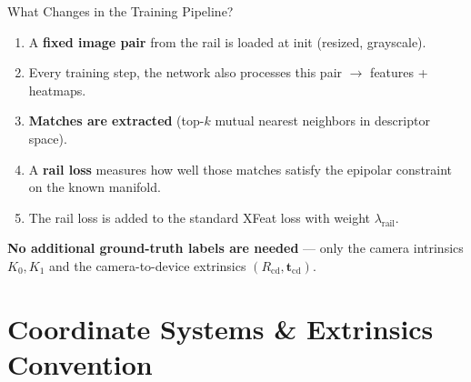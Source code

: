 \documentclass[aspectratio=169, 12pt]{beamer}
\newcommand{\Rcd}{R_{\mathrm{cd}}}
\newcommand{\tcd}{\mathbf{t}_{\mathrm{cd}}}
\begin{document}
\begin{frame}{What Changes in the Training Pipeline?}
\small
\begin{enumerate}\setlength{\itemsep}{3pt}
    \item A \textbf{fixed image pair} from the rail is loaded at init (resized, grayscale).
    \item Every training step, the network also processes this pair $\rightarrow$ features + heatmaps.
    \item \textbf{Matches are extracted} (top-$k$ mutual nearest neighbors in descriptor space).
    \item A \textbf{rail loss} measures how well those matches satisfy the epipolar constraint
          on the known manifold.
    \item The rail loss is added to the standard XFeat loss with weight $\lambda_{\mathrm{rail}}$.
\end{enumerate}

\vspace{0.3em}
\textbf{No additional ground-truth labels are needed} --- only the camera intrinsics $K_0, K_1$
and the camera-to-device extrinsics $(\Rcd, \tcd)$.
\end{frame}

\section{Coordinate Systems \& Extrinsics Convention}
\end{document}
